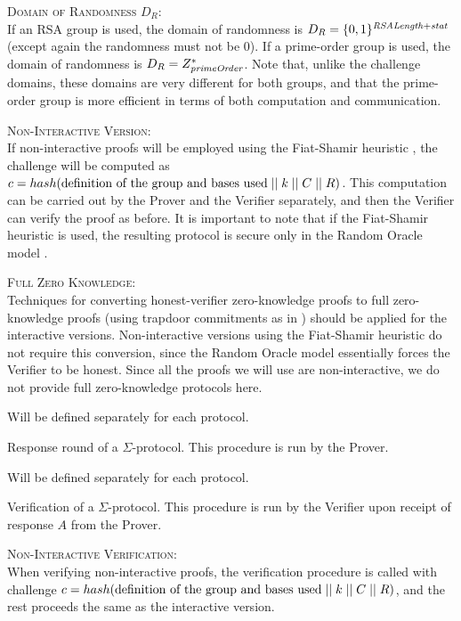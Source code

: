 \textsc{Domain of Randomness $D_R$}:\\
If an RSA group is used, the domain of randomness is $D_R = \{0,1\}^{\mathit{RSALength} + \mathit{stat}}$ (except again the randomness must not be $0$). If a prime-order group is used, the domain of randomness is $D_R = Z_{\mathit{primeOrder}}^*$. Note that, unlike the challenge domains, these domains are very different for both groups, and that the prime-order group is more efficient in terms of both computation and communication.


\textsc{Non-Interactive Version}:\\
If non-interactive proofs will be employed using the Fiat-Shamir heuristic \cite{fiatShamir}, the challenge will be computed as $c = hash(\text{definition of the group and bases used} \mid\mid k \mid\mid C \mid\mid R)$. This computation can be carried out by the Prover and the Verifier separately, and then the Verifier can verify the proof as before. It is important to note that if the Fiat-Shamir heuristic is used, the resulting protocol is secure only in the Random Oracle model \cite{brRO,cghRO}.


\textsc{Full Zero Knowledge}:\\
Techniques for converting honest-verifier zero-knowledge proofs to full zero-knowledge proofs (\ie using trapdoor commitments as in \cite{damgardTC}) should be applied for the interactive versions. Non-interactive versions using the Fiat-Shamir heuristic do not require this conversion, since the Random Oracle model essentially forces the Verifier to be honest. Since all the proofs we will use are non-interactive, we do not provide full zero-knowledge protocols here.



\begin{algorithm}[H]\label{respondHV}
\dontprintsemicolon

\BlankLine

 \;
\Indp
  Will be defined separately for each protocol.
\Indm

\caption{Response round of a $\Sigma$-protocol. This procedure is run by the Prover.}
\end{algorithm}


\begin{algorithm}[H]\label{verifyHV}
\dontprintsemicolon

\BlankLine

 \;
\Indp
  Will be defined separately for each protocol.
\Indm

\caption{Verification of a $\Sigma$-protocol. This procedure is run by the Verifier upon receipt of response $A$ from the Prover.}
\end{algorithm}


\textsc{Non-Interactive Verification}:\\
When verifying non-interactive proofs, the verification procedure is called with challenge $c = hash(\text{definition of the group and bases used} \mid\mid k \mid\mid C \mid\mid R)$, and the rest proceeds the same as the interactive version.


